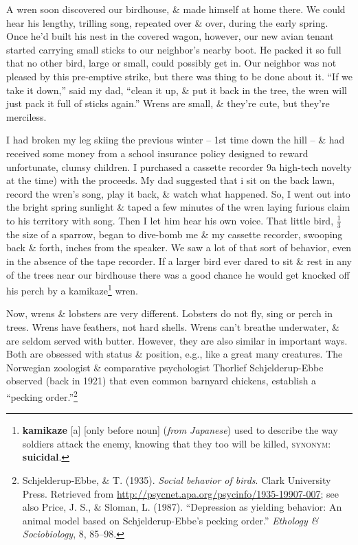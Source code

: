 \documentclass[oneside]{book}
\numberwithin{equation}{section}
\begin{document}
A wren soon discovered our birdhouse, \& made himself at home there. We could hear his lengthy, trilling song, repeated over \& over, during the early spring. Once he'd built his nest in the covered wagon, however, our new avian tenant started carrying small sticks to our neighbor's nearby boot. He packed it so full that no other bird, large or small, could possibly get in. Our neighbor was not pleased by this pre-emptive strike, but there was thing to be done about it. ``If we take it down,'' said my dad, ``clean it up, \& put it back in the tree, the wren will just pack it full of sticks again.'' Wrens are small, \& they're cute, but they're merciless.

I had broken my leg skiing the previous winter -- 1st time down the hill -- \& had received some money from a school insurance policy designed to reward unfortunate, clumsy children. I purchased a cassette recorder 9a high-tech novelty at the time) with the proceeds. My dad suggested that i sit on the back lawn, record the wren's song, play it back, \& watch what happened. So, I went out into the bright spring sunlight \& taped a few minutes of the wren laying furious claim to his territory with song. Then I let him hear his own voice. That little bird, $\frac{1}{3}$ the size of a sparrow, began to dive-bomb me \& my cassette recorder, swooping back \& forth, inches from the speaker. We saw a lot of that sort of behavior, even in the absence of the tape recorder. If a larger bird ever dared to sit \& rest in any of the trees near our birdhouse there was a good chance he would get knocked off his perch by a kamikaze\footnote{\textbf{kamikaze} [a] [only before noun] (\textit{from Japanese}) used to describe the way soldiers attack the enemy, knowing that they too will be killed, \textsc{synonym}: \textbf{suicidal}.} wren.

Now, wrens \& lobsters are very different. Lobsters do not fly, sing or perch in trees. Wrens have feathers, not hard shells. Wrens can't breathe underwater, \& are seldom served with butter. However, they are also similar in important ways. Both are obsessed with status \& position, e.g., like a great many creatures. The Norwegian zoologist \& comparative psychologist Thorlief Schjelderup-Ebbe observed (back in 1921) that even common barnyard chickens, establish a ``pecking order.''\footnote{Schjelderup-Ebbe, \& T. (1935). \textit{Social behavior of birds}. Clark University Press. Retrieved from \url{http://psycnet.apa.org/psycinfo/1935-19907-007}; see also Price, J. S., \& Sloman, L. (1987). ``Depression as yielding behavior: An animal model based on Schjelderup-Ebbe's pecking order.'' \textit{Ethology \& Sociobiology}, 8, 85--98.}
\end{document}
